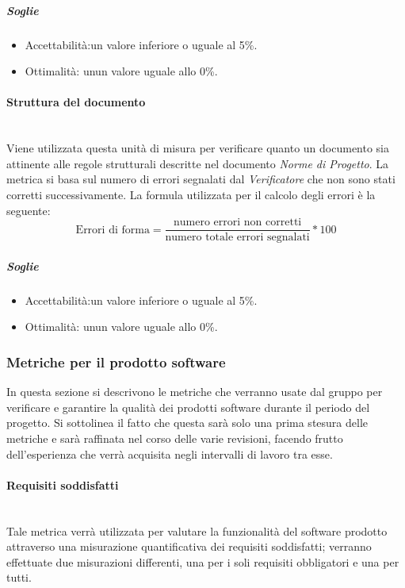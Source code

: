 \subparagraph{Soglie}
\begin{itemize}
\item Accettabilità:un valore inferiore o uguale al 5\%.
\item Ottimalità: unun valore uguale allo 0\%.
\end{itemize}

\paragraph{Struttura del documento}
	~\\Viene utilizzata questa unità di misura per verificare quanto un documento sia attinente alle regole strutturali descritte nel documento \textit{Norme di Progetto}.
La metrica si basa sul numero di errori segnalati dal \textit{Verificatore} che non sono stati corretti successivamente.
\newline La formula utilizzata per il calcolo degli errori è la seguente:
\begin{displaymath}
\mbox{Errori di forma}=\frac{\mbox{numero errori non corretti}}{\mbox{numero totale errori segnalati}}*100
\end{displaymath}

\subparagraph{Soglie}
\begin{itemize}
\item Accettabilità:un valore inferiore o uguale al 5\%.
\item Ottimalità: unun valore uguale allo 0\%.
\end{itemize}

\subsubsection{Metriche per il prodotto software}
\label{AppB:metricheSoft}
In questa sezione si descrivono le metriche che verranno usate dal gruppo per verificare e garantire la qualità dei prodotti software durante il periodo del progetto. Si sottolinea il fatto che questa sarà solo una prima stesura delle metriche e sarà raffinata nel corso delle varie revisioni, facendo frutto dell'esperienza che verrà acquisita negli intervalli di lavoro tra esse.

\paragraph{Requisiti soddisfatti}
	~\\Tale metrica verrà utilizzata per valutare la funzionalità del software prodotto attraverso una misurazione quantificativa dei requisiti soddisfatti; verranno effettuate due misurazioni differenti, una per i soli requisiti obbligatori e una per tutti.

